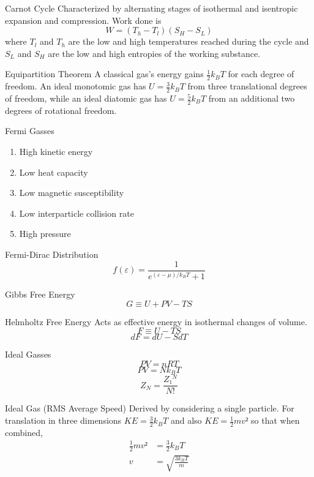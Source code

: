 \documentclass[avery5371]{flashcards}
\begin{document}
\begin{flashcard}{Carnot Cycle}
	Characterized by alternating stages of isothermal and isentropic expansion
	and compression. Work done is
	\[ W = (T_h - T_l)(S_H - S_L) \]
	where $T_l$ and $T_h$ are the low and high temperatures reached during the
	cycle and $S_L$ and $S_H$ are the low and high entropies of the working
	substance.
\end{flashcard}

\begin{flashcard}{Equipartition Theorem}
	A classical gas's energy gains $\frac 12 k_B T$ for each degree of
	freedom. An ideal monotomic gas has
		$ U = \frac 32 k_B T $
	from three translational degrees of freedom, while an ideal diatomic gas
	has
		$ U = \frac 52 k_B T $
	from an additional two degrees of rotational freedom.
\end{flashcard}

\begin{flashcard}{Fermi Gasses}
	\begin{enumerate}
		\item High kinetic energy
		\item Low heat capacity
		\item Low magnetic susceptibility
		\item Low interparticle collision rate
		\item High pressure
	\end{enumerate}
\end{flashcard}

\begin{flashcard}{Fermi-Dirac Distribution}
	\[ f(ε) = \frac{1}{e^{(ε-μ)/k_B T} + 1} \]
\end{flashcard}

\begin{flashcard}{Gibbs Free Energy}
	\[ G ≡ U + PV - TS \]
\end{flashcard}

\begin{flashcard}{Helmholtz Free Energy}
	Acts as effective energy in isothermal changes of volume.
	\[ F ≡ U - TS \]
	\[ dF = dU - S dT \]
\end{flashcard}

\begin{flashcard}{Ideal Gasses}
	\[ PV = nRT \]
	\[ PV = N k_B T \]
	\[ Z_N = \frac{Z₁^N}{N!} \]	
\end{flashcard}

\begin{flashcard}{Ideal Gas (RMS Average Speed)}
	Derived by considering a single particle. For translation in three
	dimensions $KE = \frac 32 k_B T$  and also $KE = \frac 12 mv²$ so that
	when combined,
	\begin{align*}
		\frac 12 mv² &= \frac 32 k_B T \\
		v &= \sqrt{\frac{3 k_B T}{m}}
	\end{align*}
\end{flashcard}
\end{document}
